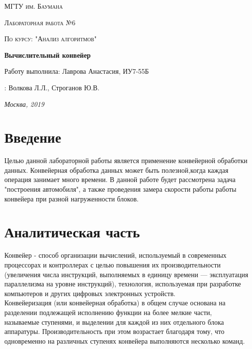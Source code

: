 \documentclass[12pt]{report}
\begin{document}
\begin{titlepage}
	\centering
	{\scshape\LARGE МГТУ им. Баумана \par}
	\vspace{3cm}
	{\scshape\Large Лабораторная работа №6\par}
	\vspace{0.5cm}	
	{\scshape\Large По курсу: "Анализ алгоритмов"\par}
	\vspace{1.5cm}
	{\huge\bfseries Вычислительный конвейер\par}
	\vspace{2cm}
	\Large Работу выполнила: Лаврова Анастасия, ИУ7-55Б\par
	\vspace{0.5cm}
	:  Волкова Л.Л., Строганов Ю.В.\par

	\vfill
	\large \textit {Москва, 2019} \par
\end{titlepage}

\tableofcontents

\newpage
\chapter*{Введение}
Целью данной лабораторной работы является применение конвейерной обработки данных. Конвейерная обработка данных может быть полезной,когда каждая операция занимает много времени. В данной работе будет рассмотрена задача "построения автомобиля", а также проведения замера скорости работы работы конвейера при разной нагруженности блоков.


\chapter{Аналитическая часть}
Конвейер - способ организации вычислений, используемый в современных процессорах и контроллерах с целью повышения их производительности (увеличения числа инструкций, выполняемых в единицу времени — эксплуатация параллелизма на уровне инструкций), технология, используемая при разработке компьютеров и других цифровых электронных устройств. \\
Конвейеризация (или конвейерная обработка) в общем случае основана на разделении подлежащей исполнению функции на более мелкие части, называемые ступенями, и выделении для каждой из них отдельного блока аппаратуры. Производительность при этом возрастает благодаря тому, что одновременно на различных ступенях конвейера выполняются несколько команд.\\
\end{document}
